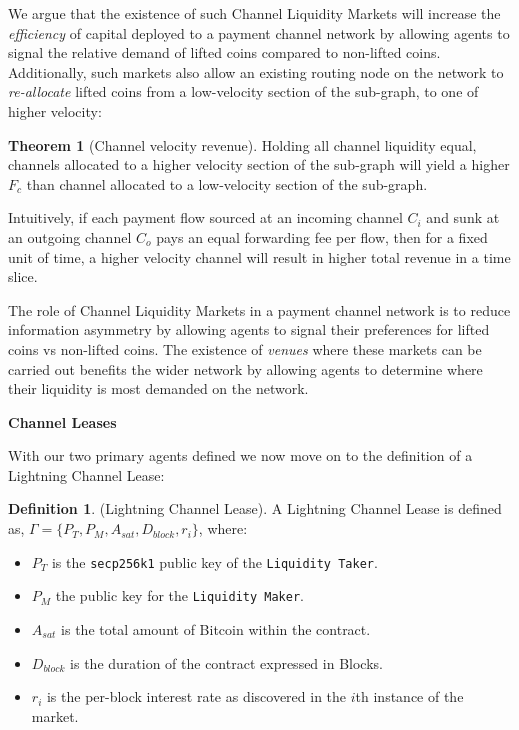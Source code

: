 \documentclass[10pt,a4paper]{article}
\theoremstyle{definition}
\newtheorem{definition}{Definition}[section]
\newtheorem{theorem}{Theorem}[section]
\begin{document}
We argue that the existence of such Channel Liquidity Markets will increase the
\emph{efficiency} of capital deployed to a payment channel network by allowing
agents to signal the relative demand of lifted coins compared to non-lifted
coins. Additionally, such markets also allow an existing routing node on the
network to \emph{re-allocate} lifted coins from a low-velocity section of the
sub-graph, to one of higher velocity:

\begin{theorem}[Channel velocity revenue] %
Holding all channel liquidity equal, channels allocated to a higher velocity
section of the sub-graph will yield a higher $F_c$  than channel allocated to a
low-velocity section of the sub-graph.
\end{theorem}

Intuitively, if each payment flow sourced at an incoming channel $C_i$ and sunk
at an outgoing channel $C_o$ pays an equal forwarding fee per flow, then for a
fixed unit of time, a higher velocity channel will result in higher total
revenue in a time slice.

The role of Channel Liquidity Markets in a payment channel network is to reduce
information asymmetry by allowing agents to signal their preferences for lifted
coins vs non-lifted coins. The existence of \emph{venues} where these markets
can be carried out benefits the wider network by allowing agents to determine
where their liquidity is most demanded on the network. %

\begin{center}
\textbf{Channel Leases}
\end{center}

With our two primary agents defined we now move on to the definition of a
Lightning Channel Lease:

\begin{definition}{(Lightning Channel Lease).}
    A Lightning Channel Lease is defined as, $\Gamma = \{P_{T}, P_{M}, A_{sat},
    D_{block}, r_{i} \}$, where:
\end{definition}

\begin{itemize}
    \item $P_{T}$ is the \texttt{secp256k1} public key of the \texttt{Liquidity Taker}. 
    \item $P_{M}$ the public key for the \texttt{Liquidity Maker}. 
    \item $A_{sat}$ is the total amount of Bitcoin within the contract.
    \item $D_{block}$ is the duration of the contract expressed in Blocks.
    \item $r_{i}$ is the per-block interest rate as discovered in the $i$th
    instance of the market.
\end{itemize}
\end{document}
